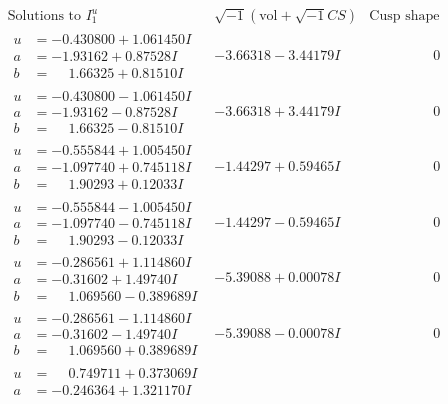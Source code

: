 \documentclass[1p]{elsarticle_modified}
\theoremstyle{definition}
\newcommand{\I}{\sqrt{-1}}
\begin{document}
$$\begin{array}{c|c|c}
\text{Solutions to }I^u_{1}& \I (\text{vol} + \sqrt{-1}CS) & \text{Cusp shape}\\
 \hline 
\begin{aligned}
u &= -0.430800 + 1.061450 I \\
a &= -1.93162 + 0.87528 I \\
b &= \phantom{-}1.66325 + 0.81510 I\end{aligned}
 & -3.66318 - 3.44179 I & \phantom{-0.000000 } 0 \\ \hline\begin{aligned}
u &= -0.430800 - 1.061450 I \\
a &= -1.93162 - 0.87528 I \\
b &= \phantom{-}1.66325 - 0.81510 I\end{aligned}
 & -3.66318 + 3.44179 I & \phantom{-0.000000 } 0 \\ \hline\begin{aligned}
u &= -0.555844 + 1.005450 I \\
a &= -1.097740 + 0.745118 I \\
b &= \phantom{-}1.90293 + 0.12033 I\end{aligned}
 & -1.44297 + 0.59465 I & \phantom{-0.000000 } 0 \\ \hline\begin{aligned}
u &= -0.555844 - 1.005450 I \\
a &= -1.097740 - 0.745118 I \\
b &= \phantom{-}1.90293 - 0.12033 I\end{aligned}
 & -1.44297 - 0.59465 I & \phantom{-0.000000 } 0 \\ \hline\begin{aligned}
u &= -0.286561 + 1.114860 I \\
a &= -0.31602 + 1.49740 I \\
b &= \phantom{-}1.069560 - 0.389689 I\end{aligned}
 & -5.39088 + 0.00078 I & \phantom{-0.000000 } 0 \\ \hline\begin{aligned}
u &= -0.286561 - 1.114860 I \\
a &= -0.31602 - 1.49740 I \\
b &= \phantom{-}1.069560 + 0.389689 I\end{aligned}
 & -5.39088 - 0.00078 I & \phantom{-0.000000 } 0 \\ \hline\begin{aligned}
u &= \phantom{-}0.749711 + 0.373069 I \\
a &= -0.246364 + 1.321170 I \\

\end{aligned}
\end{array}$$
\end{document}
